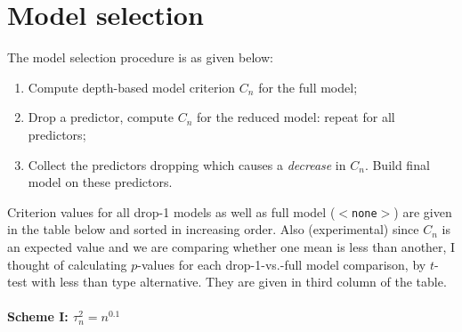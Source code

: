\documentclass[fleqn,11pt]{article}
\begin{document}
\section{Model selection}
The model selection procedure is as given below:
\begin{enumerate}
\item Compute depth-based model criterion $C_n$ for the full model;
\item Drop a predictor, compute $C_n$ for the reduced model: repeat for all predictors;
\item Collect the predictors dropping which causes a \textit{decrease} in $C_n$. Build final model on these predictors.
\end{enumerate}	

Criterion values for all drop-1 models as well as full model (\texttt{$<$none$>$}) are given in the table below and sorted in increasing order. Also (experimental) since $C_n$ is an expected value and we are comparing whether one mean is less than another, I thought of calculating $p$-values for each drop-1-vs.-full model comparison, by $t$-test with less than type alternative. They are given in third column of the table.

\paragraph{Scheme I: $\tau_n^2 = n^{0.1}$}
\end{document}
